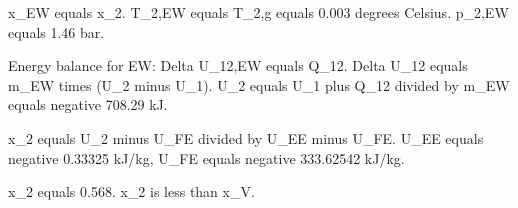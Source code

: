 x_EW equals x_2.  
T_2,EW equals T_2,g equals 0.003 degrees Celsius.  
p_2,EW equals 1.46 bar.  

Energy balance for EW: Delta U_12,EW equals Q_12.  
Delta U_12 equals m_EW times (U_2 minus U_1).  
U_2 equals U_1 plus Q_12 divided by m_EW equals negative 708.29 kJ.  

x_2 equals U_2 minus U_FE divided by U_EE minus U_FE.  
U_EE equals negative 0.33325 kJ/kg, U_FE equals negative 333.62542 kJ/kg.  

x_2 equals 0.568.  
x_2 is less than x_V.